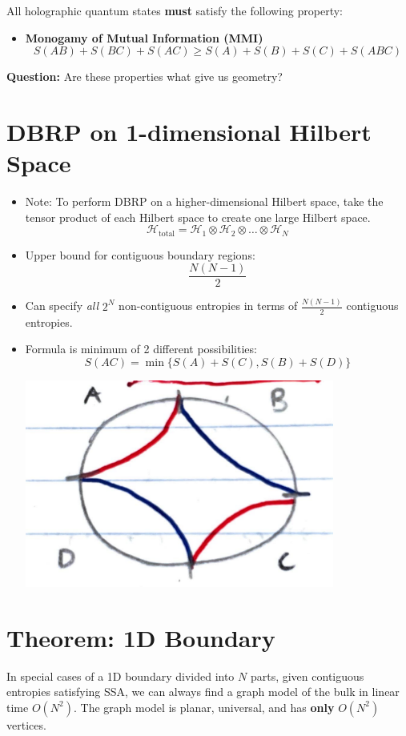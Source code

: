 \documentclass{article}
\begin{document}
All holographic quantum states \textbf{must} satisfy the following property:
\begin{itemize}
    \item \textbf{Monogamy of Mutual Information (MMI)}
    \[
    S(AB) + S(BC) + S(AC) \geq S(A) + S(B) + S(C) + S(ABC)
    \]
\end{itemize}

\textbf{Question:} Are these properties what give us geometry?

\section{DBRP on 1-dimensional Hilbert Space}
\begin{itemize}
    \item Note: To perform DBRP on a higher-dimensional Hilbert space, take the tensor product of each Hilbert space to create one large Hilbert space.
    \[
    \mathcal{H}_{\text{total}} = \mathcal{H}_1 \otimes \mathcal{H}_2 \otimes \dots \otimes \mathcal{H}_N
    \]
    \item Upper bound for contiguous boundary regions: 
    \[
    \frac{N(N-1)}{2}
    \]
    \item Can specify \textit{all} \( 2^N \) non-contiguous entropies in terms of \( \frac{N(N-1)}{2} \) contiguous entropies.
    \item Formula is minimum of 2 different possibilities:
    \[
    S(AC) = \min\{ S(A) + S(C), S(B) + S(D) \}
    \]
    \begin{center}
        \includegraphics[width=0.8\textwidth]{parts.pdf}
    \end{center}
\end{itemize}


\section{Theorem: 1D Boundary}
In special cases of a 1D boundary divided into \( N \) parts, given contiguous entropies satisfying SSA, we can always find a graph model of the bulk in linear time \( O(N^2) \). The graph model is planar, universal, and has \textbf{only} \( O(N^2) \) vertices.
\end{document}
